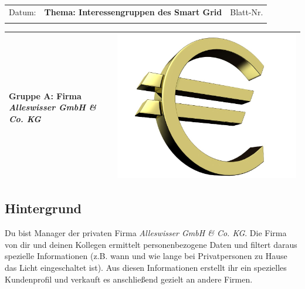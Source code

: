 \documentclass[11pt,a4paper,DIV=10,parskip=half,BCOR=0mm]{scrartcl}
\begin{document}
\setlength{\tabcolsep}{3mm} %
\noindent
\begin{tabularx}{\textwidth}{|l|T|l|}
\hline
Datum: & \rule{0pt}{5mm} \textbf{\textsf{Thema: Interessengruppen des Smart Grid}} & Blatt-Nr. \\
&&\\
\hline
\end{tabularx}

%
\setlength{\tabcolsep}{0mm} %
\begin{tabularx}{\linewidth}{lXr}
{\Large\textsf{\textbf{Gruppe A:} Firma \textit{Alleswisser GmbH \& Co. KG}}} & &
\includegraphics[scale=0.04]{images/euro}\\ %
\hline
\end{tabularx}
%
\subsection*{Hintergrund}
Du bist Manager der privaten Firma \textit{Alleswisser GmbH \& Co. KG}.
Die Firma von dir und deinen Kollegen ermittelt  personenbezogene Daten und filtert daraus spezielle Informationen (z.B. wann und wie lange bei
Privatpersonen zu Hause das Licht eingeschaltet ist). Aus diesen
Informationen erstellt ihr ein spezielles Kundenprofil und verkauft es
anschließend gezielt an andere Firmen.
\end{document}
